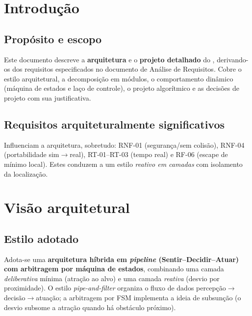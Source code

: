 
\newcommand{\tipodoc}{Arquitetura e Projeto do Sistema}
\newcommand{\datadoc}{30 de junho de 2026}


\fazcapa
\controleversoes
\tableofcontents
\newpage

\section{Introdução}
\subsection{Propósito e escopo}
Este documento descreve a \textbf{arquitetura} e o \textbf{projeto detalhado} do \emph{\projnome}, derivando-os dos requisitos especificados no documento de Análise de Requisitos. Cobre o estilo arquitetural, a decomposição em módulos, o comportamento dinâmico (máquina de estados e laço de controle), o projeto algorítmico e as decisões de projeto com sua justificativa.

\subsection{Requisitos arquiteturalmente significativos}
Influenciam a arquitetura, sobretudo: RNF-01 (segurança/sem colisão), RNF-04 (portabilidade sim$\to$real), RT-01--RT-03 (tempo real) e RF-06 (escape de mínimo local). Estes conduzem a um estilo \emph{reativo em camadas} com isolamento da localização.

\section{Visão arquitetural}
\subsection{Estilo adotado}
Adota-se uma \textbf{arquitetura híbrida em \emph{pipeline} (Sentir--Decidir--Atuar) com arbitragem por máquina de estados}, combinando uma camada \emph{deliberativa} mínima (atração ao alvo) e uma camada \emph{reativa} (desvio por proximidade). O estilo \emph{pipe-and-filter} organiza o fluxo de dados percepção$\to$decisão$\to$atuação; a arbitragem por FSM implementa a ideia de subsunção (o desvio subsome a atração quando há obstáculo próximo).

